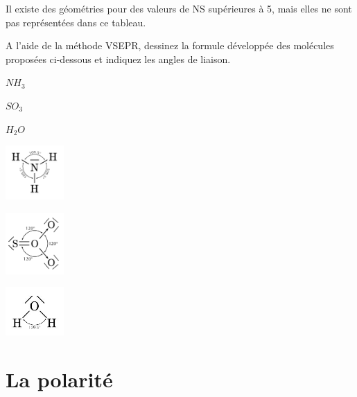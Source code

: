 \documentclass[
  11pt,
  french,
  a4paper,
  openany]{book}
\begin{document}
Il existe des géométries pour des valeurs de NS supérieures à 5, mais elles ne sont pas représentées dans ce tableau.

\begin{Exercise}

A l'aide de la méthode VSEPR, dessinez la formule développée des molécules proposées ci-dessous et indiquez les angles de liaison.

\begin{multicols}{3}
\(NH_3\)

\(SO_3\)

\(H_2O\)

\end{multicols}



\end{Exercise}

\begin{Answer}

\begin{multicols}{3}
\includegraphics[width=6em,height=\textheight]{exe/molecules-10-NH3.png}

\includegraphics[width=6em,height=\textheight]{exe/molecules-10-SO3.png}

\includegraphics[width=6em,height=\textheight]{exe/molecules-10-H2O.png}

\end{multicols}


\end{Answer}

\newpage

\hypertarget{la-polarituxe9}{%
\section{La polarité}\label{la-polarituxe9}}
\end{document}
